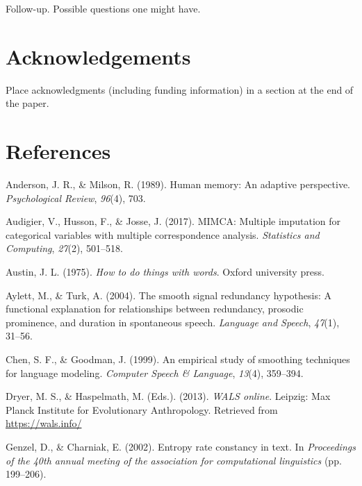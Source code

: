 \documentclass[10pt, letterpaper]{article}
\begin{document}
Follow-up. Possible questions one might have.

\hypertarget{acknowledgements}{%
\section{Acknowledgements}\label{acknowledgements}}

Place acknowledgments (including funding information) in a section at
the end of the paper.

\hypertarget{references}{%
\section{References}\label{references}}

\setlength{\parindent}{-0.1in} 
\setlength{\leftskip}{0.125in}

\noindent

\hypertarget{refs}{}
\leavevmode\hypertarget{ref-anderson1989}{}%
Anderson, J. R., \& Milson, R. (1989). Human memory: An adaptive
perspective. \emph{Psychological Review}, \emph{96}(4), 703.

\leavevmode\hypertarget{ref-audigier2017}{}%
Audigier, V., Husson, F., \& Josse, J. (2017). MIMCA: Multiple
imputation for categorical variables with multiple correspondence
analysis. \emph{Statistics and Computing}, \emph{27}(2), 501--518.

\leavevmode\hypertarget{ref-austin1975}{}%
Austin, J. L. (1975). \emph{How to do things with words}. Oxford
university press.

\leavevmode\hypertarget{ref-aylett2004}{}%
Aylett, M., \& Turk, A. (2004). The smooth signal redundancy hypothesis:
A functional explanation for relationships between redundancy, prosodic
prominence, and duration in spontaneous speech. \emph{Language and
Speech}, \emph{47}(1), 31--56.

\leavevmode\hypertarget{ref-chen1999empirical}{}%
Chen, S. F., \& Goodman, J. (1999). An empirical study of smoothing
techniques for language modeling. \emph{Computer Speech \& Language},
\emph{13}(4), 359--394.

\leavevmode\hypertarget{ref-wals}{}%
Dryer, M. S., \& Haspelmath, M. (Eds.). (2013). \emph{WALS online}.
Leipzig: Max Planck Institute for Evolutionary Anthropology. Retrieved
from \url{https://wals.info/}

\leavevmode\hypertarget{ref-genzel2002}{}%
Genzel, D., \& Charniak, E. (2002). Entropy rate constancy in text. In
\emph{Proceedings of the 40th annual meeting of the association for
computational linguistics} (pp. 199--206).
\end{document}
